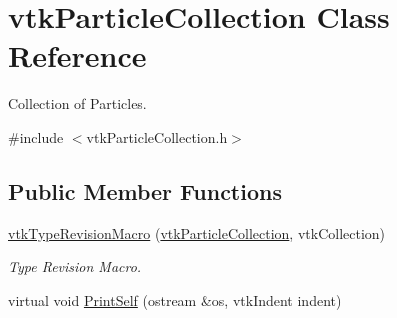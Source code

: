\hypertarget{classvtkParticleCollection}{
\section{vtkParticleCollection Class Reference}
\label{classvtkParticleCollection}
}


Collection of Particles.  




{\ttfamily \#include $<$vtkParticleCollection.h$>$}

\subsection*{Public Member Functions}
\begin{DoxyCompactItemize}
\item 
\hypertarget{classvtkParticleCollection_a0575be0d8d27590daadf83cdd6c38258}{
\hyperlink{classvtkParticleCollection_a0575be0d8d27590daadf83cdd6c38258}{vtkTypeRevisionMacro} (\hyperlink{classvtkParticleCollection}{vtkParticleCollection}, vtkCollection)}
\label{classvtkParticleCollection_a0575be0d8d27590daadf83cdd6c38258}

\begin{DoxyCompactList}\small\item\em Type Revision Macro. \item\end{DoxyCompactList}\item 
\hypertarget{classvtkParticleCollection_a97fa38a36863745844ee70a0939894c4}{
virtual void \hyperlink{classvtkParticleCollection_a97fa38a36863745844ee70a0939894c4}{PrintSelf} (ostream \&os, vtkIndent indent)}
\label{classvtkParticleCollection_a97fa38a36863745844ee70a0939894c4}


\end{DoxyCompactItemize}
